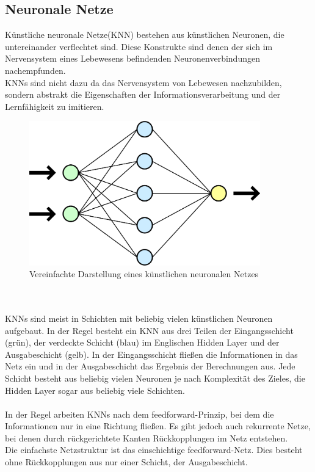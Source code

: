 \documentclass[12pt,oneside,a4paper,parskip]{scrbook}
\begin{document}
\subsection{Neuronale Netze}
Künstliche neuronale Netze(KNN) bestehen aus künstlichen Neuronen, die untereinander verflechtet sind. Diese Konstrukte sind denen der sich im Nervensystem eines Lebewesens befindenden Neuronenverbindungen nachempfunden. \\
KNNs sind nicht dazu da das Nervensystem von Lebewesen nachzubilden, sondern abstrakt die Eigenschaften der Informationsverarbeitung und der Lernfähigkeit zu imitieren.
\begin{figure}[h]
	\begin{center}
		\includegraphics[width=10cm]{Bilder/Neurales_Netz.png}
		\caption{Vereinfachte Darstellung eines künstlichen neuronalen Netzes}
		\label{fig:wikiNeuronalesNetz}
	\end{center}
\end{figure}
\\\\KNNs sind meist in Schichten mit beliebig vielen künstlichen Neuronen aufgebaut. In der Regel besteht ein KNN aus drei Teilen der Eingangsschicht (grün), der verdeckte Schicht (blau) im Englischen Hidden Layer und der Ausgabeschicht (gelb). In der Eingangsschicht fließen die Informationen in das Netz ein und in der Ausgabeschicht das Ergebnis der Berechnungen aus. Jede Schicht besteht aus beliebig vielen Neuronen je nach Komplexität des Zieles, die Hidden Layer sogar aus beliebig viele Schichten.
\\\\
In der Regel arbeiten KNNs nach dem feedforward-Prinzip, bei dem die Informationen nur in eine Richtung fließen. Es gibt jedoch auch rekurrente Netze, bei denen durch rückgerichtete Kanten Rückkopplungen im Netz entstehen. \\
Die einfachste Netzstruktur ist das einschichtige feedforward-Netz. Dies besteht ohne Rückkopplungen aus nur einer Schicht, der Ausgabeschicht.
\end{document}
